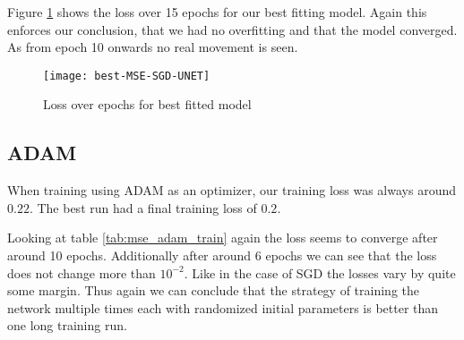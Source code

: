 Figure \ref{im:best-MSE-SGD-UNET} shows the loss over 15 epochs for
our best fitting model. Again this enforces our conclusion, that we had no overfitting and that the model converged.
As from epoch 10 onwards no real movement is seen.


\begin{figure}[h]
\texttt{[image: best-MSE-SGD-UNET]}
\caption{\label{im:best-MSE-SGD-UNET} Loss over epochs for best fitted model}
\end{figure}

\newpage

\subsection{ADAM}
When training using ADAM as an optimizer, our training loss was always around $0.22$. 
The best run had a final training loss of $0.2$. 

Looking at table \ref{tab:mse_adam_train} again the loss seems to converge after around 10 epochs. 
Additionally after around 6 epochs we can see that the loss does not change more than $10^{-2}$. Like in the 
case of SGD the losses vary by quite some margin. Thus again we can conclude that the 
strategy of training the network multiple times each with randomized initial parameters
is better than one long training run.

